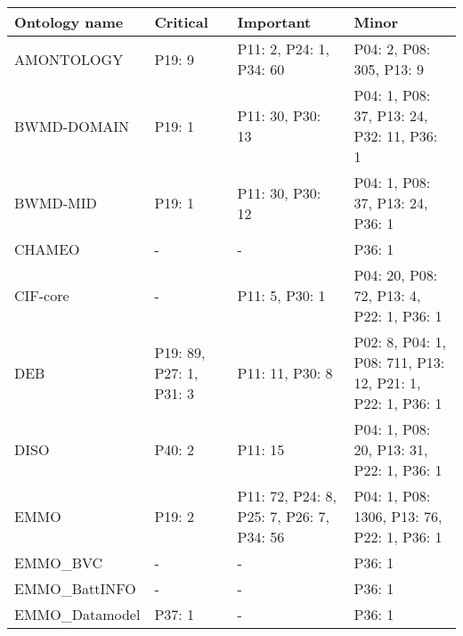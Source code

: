 \begin{tabular}{m{4cm}m{3cm}m{3cm}m{5cm}}
\toprule
          Ontology name &                Critical &                                                Important &                                                      Minor \\
\midrule
             AMONTOLOGY &                  P19: 9 &                                  P11: 2, P24: 1, P34: 60 &                                   P04: 2, P08: 305, P13: 9 \\
            BWMD-DOMAIN &                  P19: 1 &                                         P11: 30, P30: 13 &                  P04: 1, P08: 37, P13: 24, P32: 11, P36: 1 \\
               BWMD-MID &                  P19: 1 &                                         P11: 30, P30: 12 &                           P04: 1, P08: 37, P13: 24, P36: 1 \\
                 CHAMEO &                       - &                                                        - &                                                     P36: 1 \\
               CIF-core &                       - &                                           P11: 5, P30: 1 &                   P04: 20, P08: 72, P13: 4, P22: 1, P36: 1 \\
                    DEB & P19: 89, P27: 1, P31: 3 &                                          P11: 11, P30: 8 &  P02: 8, P04: 1, P08: 711, P13: 12, P21: 1, P22: 1, P36: 1 \\
                   DISO &                  P40: 2 &                                                  P11: 15 &                   P04: 1, P08: 20, P13: 31, P22: 1, P36: 1 \\
                   EMMO &                  P19: 2 &                 P11: 72, P24: 8, P25: 7, P26: 7, P34: 56 &                 P04: 1, P08: 1306, P13: 76, P22: 1, P36: 1 \\
               EMMO_BVC &                       - &                                                        - &                                                     P36: 1 \\
          EMMO_BattINFO &                       - &                                                        - &                                                     P36: 1 \\
         EMMO_Datamodel &                  P37: 1 &                                                        - &                                                     P36: 1 \\

\end{tabular}
